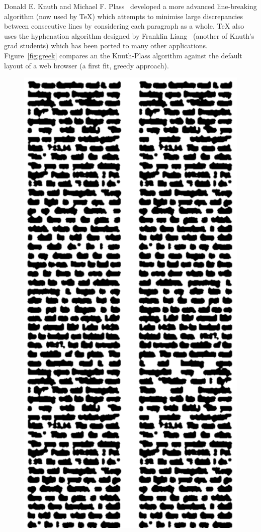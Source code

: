 Donald E. Knuth and Michael F. Plass~\cite{Knuth1981} developed a more advanced line-breaking algorithm (now used by \TeX{}) which attempts to minimise large discrepancies between consecutive lines by considering each paragraph as a whole. \TeX{} also uses the hyphenation algorithm designed by Franklin Liang~\cite{Liang1983} (another of Knuth's grad students) which has been ported to many other applications. Figure~\ref{fig:greek} compares an the Knuth-Plass algorithm against the default layout of a web browser (a first fit, greedy approach).


\begin{figure}
\begin{center}
\includegraphics[height=0.8\textheight]{gfx/greek}

\end{center}
\end{figure}
